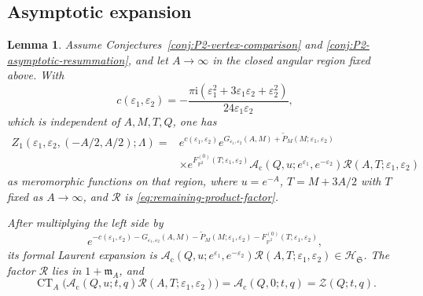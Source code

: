 \documentclass{amsart}
\newtheorem{lemma}{Lemma}
\theoremstyle{definition}
\numberwithin{equation}{section}
\newcommand{\eps}{\varepsilon}
\begin{document}
\subsection{Asymptotic expansion}
\begin{lemma}
\label{lem:full-u-zero-expansion}
Assume Conjectures~\ref{conj:P2-vertex-comparison} and \ref{conj:P2-asymptotic-resummation}, and let \(A\to\infty\) in the closed angular region fixed above.  With
\[
 c(\eps_1,\eps_2)
 =-\frac{\pi\mathrm{i}(\eps_1^2+3\eps_1\eps_2+\eps_2^2)}
 {24\eps_1\eps_2},
\]
which is independent of \(A,M,T,Q\), one has
\begin{equation}
\begin{aligned}
 Z_1(\eps_1,\eps_2,(-A/2,A/2);\Lambda)
 ={}&e^{c(\eps_1,\eps_2)}
 e^{G_{\eps_1,\eps_2}(A,M)
       +\widetilde P_M(M;\eps_1,\eps_2)}\\
 &\times e^{F_{\mathbb P^2}^{(0)}
       (T;\eps_1,\eps_2)}
 \mathscr A_{\mathrm c}(Q,u;e^{\eps_1},e^{-\eps_2})
 \mathcal R(A,T;\eps_1,\eps_2)
\end{aligned}
\label{eq:full-u-zero-expansion}
\end{equation}
as meromorphic functions on that region, where \(u=e^{-A}\), \(T=M+3A/2\) with \(T\) fixed as \(A\to\infty\), and \(\mathcal R\) is \eqref{eq:remaining-product-factor}.

After multiplying the left side by
\[
 e^{-c(\eps_1,\eps_2)
    -G_{\eps_1,\eps_2}(A,M)
    -\widetilde P_M(M;\eps_1,\eps_2)
    -F_{\mathbb P^2}^{(0)}(T;\eps_1,\eps_2)},
\]
its formal Laurent expansion is \(\mathscr A_{\mathrm c}(Q,u;e^{\eps_1},e^{-\eps_2}) \mathcal R(A,T;\eps_1,\eps_2)\in\mathscr H_{\mathfrak S}\).  The factor \(\mathcal R\) lies in \(1+\mathfrak m_A\), and
\begin{equation}
 \operatorname{CT}_A\bigl(
 \mathscr A_{\mathrm c}(Q,u;t,q)\mathcal R(A,T;\eps_1,\eps_2)\bigr)
 =\mathscr A_{\mathrm c}(Q,0;t,q)=\mathcal Z(Q;t,q).
\label{eq:u-zero-order-zero}
\end{equation}
\end{lemma}
\end{document}
